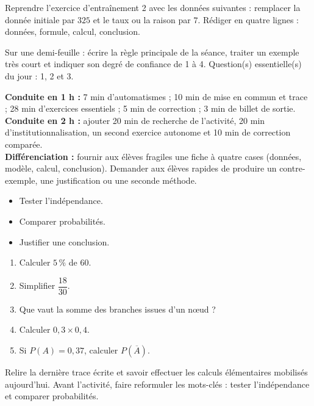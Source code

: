     \begin{dm}Reprendre l'exercice d'entraînement 2 avec les données suivantes : remplacer la donnée initiale par $325$ et le taux ou la raison par $7$. Rédiger en quatre lignes : données, formule, calcul, conclusion.\end{dm}

    \begin{sortie}Sur une demi-feuille : écrire la règle principale de la séance, traiter un exemple très court et indiquer son degré de confiance de 1 à 4. Question(s) essentielle(s) du jour : 1, 2 et 3.\end{sortie}

    \ifprof
    \begin{methode}
    \textbf{Conduite en 1 h :} 7 min d'automatismes ; 10 min de mise en commun et trace ; 28 min d'exercices essentiels ; 5 min de correction ; 3 min de billet de sortie.\\
    \textbf{Conduite en 2 h :} ajouter 20 min de recherche de l'activité, 20 min d'institutionnalisation, un second exercice autonome et 10 min de correction comparée.\\
    \textbf{Différenciation :} fournir aux élèves fragiles une fiche à quatre cases (données, modèle, calcul, conclusion). Demander aux élèves rapides de produire un contre-exemple, une justification ou une seconde méthode.
    \end{methode}
    \fi
{}
\begin{objectifs}\begin{itemize}\item Tester l'indépendance.\item Comparer probabilités.\item Justifier une conclusion.\end{itemize}\end{objectifs}
\begin{automatismes}\begin{enumerate}\item Calculer $5\,\%$ de $60$. \item Simplifier $\dfrac{18}{30}$. \item Que vaut la somme des branches issues d'un nœud ? \item Calculer $0{,}3\times0{,}4$. \item Si $P(A)=0{,}37$, calculer $P(\overline A)$. \end{enumerate}\end{automatismes}
\begin{prerequis}Relire la dernière trace écrite et savoir effectuer les calculs élémentaires mobilisés aujourd'hui. Avant l'activité, faire reformuler les mots-clés : tester l'indépendance et comparer probabilités.\end{prerequis}

